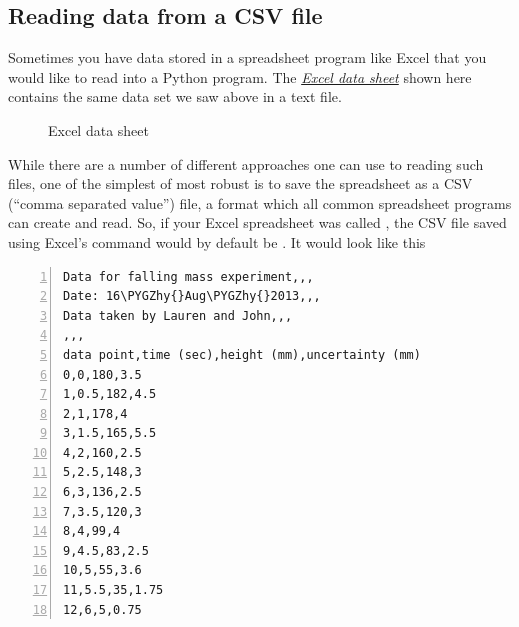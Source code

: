 \documentclass[letterpaper,10pt,english]{sphinxmanual}
\def\PYGZhy{\char`\-}
\begin{document}
\subsection{Reading data from a CSV file}
\label{chap4/chap4_io:reading-data-from-a-csv-file}
Sometimes you have data stored in a spreadsheet program like Excel that you would like to read into a Python program.  The {\hyperref[chap4/chap4_io:fig-excelwindow]{\emph{Excel data sheet}}} shown here contains the same data set we saw above in a text file.
\begin{figure}[htbp]
\centering
\capstart

\caption{Excel data sheet}\label{chap4/chap4_io:fig-excelwindow}\end{figure}

While there are a number of different approaches one can use to reading such files, one of the simplest of most robust is to save the spreadsheet as a CSV (``comma separated value'') file, a format which all common spreadsheet programs can create and read.  So, if your Excel spreadsheet was called , the CSV file saved using Excel's  command would by default be .  It would look like this

\begin{Verbatim}[commandchars=\\\{\},numbers=left,firstnumber=1,stepnumber=1]
Data for falling mass experiment,,,
Date: 16\PYGZhy{}Aug\PYGZhy{}2013,,,
Data taken by Lauren and John,,,
,,,
data point,time (sec),height (mm),uncertainty (mm)
0,0,180,3.5
1,0.5,182,4.5
2,1,178,4
3,1.5,165,5.5
4,2,160,2.5
5,2.5,148,3
6,3,136,2.5
7,3.5,120,3
8,4,99,4
9,4.5,83,2.5
10,5,55,3.6
11,5.5,35,1.75
12,6,5,0.75
\end{Verbatim}
\end{document}
